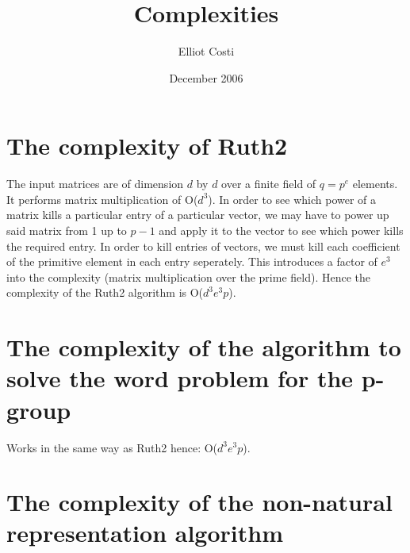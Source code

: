 \documentclass[12pt]{article}
\begin{document}
\title{Complexities} 
\author{Elliot Costi}
\date{December 2006}
\maketitle

\section{The complexity of Ruth2}
\label{}

\newline
\newline
The input matrices are of dimension $d$ by $d$ over a finite field of $q = p^e$ elements.
\newline
\newline
It performs matrix multiplication of O($d^3$). In order to see which power of a matrix kills a particular entry of a particular vector, we may have to power up said matrix from 1 up to $p-1$ and apply it to the vector to see which power kills the required entry. In order to kill entries of vectors, we must kill each coefficient of the primitive element in each entry seperately. This introduces a factor of $e^3$ into the complexity (matrix multiplication over the prime field).
\newline
\newline
Hence the complexity of the Ruth2 algorithm is O($d^3 e^3 p$).

\section{The complexity of the algorithm to solve the word problem for the p-group}
\label{}

Works in the same way as Ruth2 hence: O($d^3 e^3 p$).


\section{The complexity of the non-natural representation algorithm}
\label{}
\end{document}
